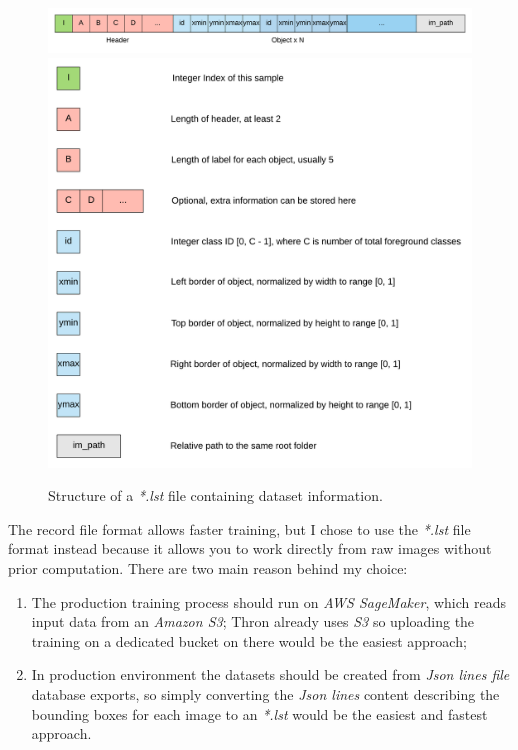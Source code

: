 \begin{figure}[htbp]
\begin{center}
\includegraphics[width=\textwidth]{immagini/pictures/detection_label.png}
\includegraphics[width=\textwidth]{immagini/pictures/detection_label_detail.png} 
\caption{Structure of a \emph{*.lst} file containing dataset information.}
\end{center}
\end{figure}

The record file format allows faster training, but I chose to use the \emph{*.lst} file format instead because it allows you to work directly from raw images without prior computation. There are two main reason behind my choice:
\begin{enumerate}
	\item The production training process should run on \emph{AWS SageMaker}, which reads input data from an \emph{Amazon S3}; Thron already uses \emph{S3} so uploading the training on a dedicated bucket on there would be the easiest approach;
	\item In production environment the datasets should be created from \emph{Json lines file} database exports, so simply converting the \emph{Json lines} content describing the bounding boxes for each image to an \emph{*.lst} would be the easiest and fastest approach.
\end{enumerate}



